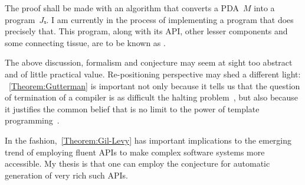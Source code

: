 The proof shall be made with an algorithm that converts a
  PDA~$M$ into a program~$Jₛ$.
I am currently in the process of implementing a program that
  does precisely that.
This program, along with its API, other lesser components and
  some connecting tissue, are to be known as \Self.

The above discussion, formalism and conjecture may seem at sight too abstract
  and of little practical value.
Re-positioning perspective may shed a different light:
~\cref{Theorem:Gutterman} is important not only because it tells us
  that the question of termination of a \CC compiler is as difficult
  the halting problem~\cite{Turing:1936}, but also because it
  justifies the common belief that is no limit to the power of
  template programming~\cite{Musser:Stepanov:1989,Dehnert:Stepanov:2000
  ,Backhouse:Jansson:1999, Austern:1998,Bracha:Odersky:1998,Garcia:Jarvi:2003}.

In the fashion,~\cref{Theorem:Gil-Levy} has important
  implications to the emerging trend of employing fluent APIs
  to make complex software systems more accessible.
My thesis is that one can employ the conjecture for
  automatic generation of very rich such APIs.
